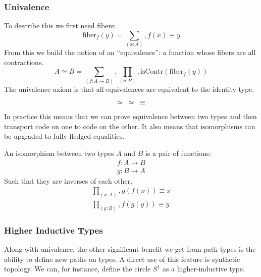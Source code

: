 \begin{refsection}
\begin{subappendices}
\subsubsection{Univalence}
To describe this we first need fibers:
\begin{equation}
  \text{fiber}_f(y) = \sum_{(x : A)} , f (x) \equiv y
\end{equation}
From this we build the notion of an ``equivalence'': a function whose fibers are
all contractions.
\begin{equation}
  A \simeq B = \sum_{(f : A \rightarrow B)}, \prod_{(y : B)} , \text{isContr}(\text{fiber}_f(y))
\end{equation}
The univalence axiom is that all equivalences are equivalent to the identity
type.
\begin{definition}
  \begin{equation}
    \simeq \; \simeq \; \equiv
  \end{equation}
\end{definition}
In practice this means that we can prove equivalence between two types and then
transport code on one to code on the other.
It also means that isomorphisms can be upgraded to fully-fledged equalities.
\begin{definition}[Isomorphism]
  An isomorphism between two types \(A\) and \(B\) is a pair of functions:
  \begin{align}
    f : A \rightarrow B \\
    g : B \rightarrow A
  \end{align}
  Such that they are inverses of each other.
  \begin{align}
    \prod_{(x : A)} , g(f(x)) \equiv x \\
    \prod_{(y : B)} , f(g(y)) \equiv y
  \end{align}
\end{definition}
\subsubsection{Higher Inductive Types}
Along with univalence, the other significant benefit we get from path types is
the ability to define new paths on types.
A direct use of this feature is synthetic topology.
We can, for instance, define the circle \(S^1\) as a higher-inductive type.


\end{subappendices}
\end{refsection}
